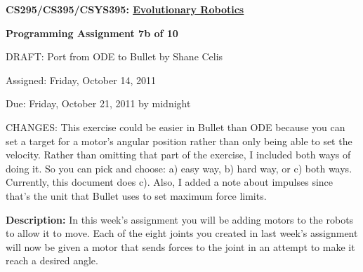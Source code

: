 \documentclass[12pt]{article}
\begin{document}
\centerline{\bf \Large CS295/CS395/CSYS395: \href{CS295_395_Syllabus.pdf}{\underline{Evolutionary Robotics}}}

\vspace{0.5cm}

\centerline{\bf \large Programming Assignment 7b of 10}   
\vspace{0.25cm} \centerline{\color{red}DRAFT: Port from ODE to Bullet by Shane Celis \color{black}}

\vspace{0.5cm}

\centerline{\large Assigned: Friday, October 14, 2011}

\vspace{0.5cm}

\centerline{\large Due: Friday, October 21, 2011 by midnight}

\vspace{0.5cm}

\noindent \color{red}CHANGES: This exercise could be easier in Bullet than ODE because you can set a target for a motor's angular position rather than only being able to set the velocity.  Rather than omitting that part of the exercise, I included both ways of doing it.  So you can pick and choose: a) easy way, b) hard way, or c) both ways.  Currently, this document does c).  Also, I added a note about impulses since that's the unit that Bullet uses to set maximum force limits. \color{black}

\noindent \textbf{Description:} In this week's assignment you will be adding motors to the robots to allow it to move. Each of the eight joints you created in last week's assignment will now be given a motor that sends forces to the joint in an attempt to make it reach a desired angle.
\end{document}
